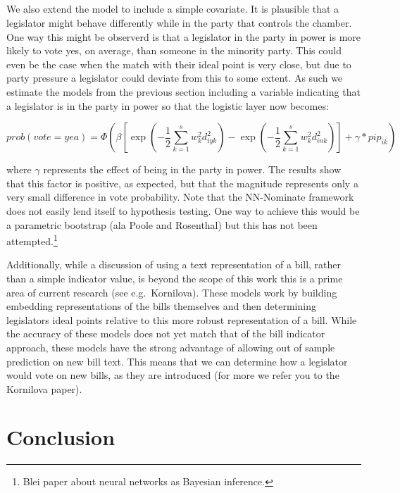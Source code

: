 \documentclass[11pt,]{article}
\begin{document}
\subsection{}\label{section-1}

We also extend the model to include a simple covariate. It is plausible
that a legislator might behave differently while in the party that
controls the chamber. One way this might be observerd is that a
legislator in the party in power is more likely to vote yes, on average,
than someone in the minority party. This could even be the case when the
match with their ideal point is very close, but due to party pressure a
legislator could deviate from this to some extent. As such we estimate
the models from the previous section including a variable indicating
that a legislator is in the party in power so that the logistic layer
now becomes:

\begin{equation}
prob(vote=yea) = \Phi\left(\beta \left[\exp\left(-\frac{1}{2}\sum_{k=1}^s w_k^2 d_{iyk}^2 \right) - \exp\left({-\frac{1}{2}\sum_{k=1}^s w_k^2 d_{ink}^2 }\right)\right] + \gamma * pip_{ik}\right)
\end{equation}

where \(\gamma\) represents the effect of being in the party in power.
The results show that this factor is positive, as expected, but that the
magnitude represents only a very small difference in vote probability.
Note that the NN-Nominate framework does not easily lend itself to
hypothesis testing. One way to achieve this would be a parametric
bootstrap (ala Poole and Rosenthal) but this has not been
attempted.\footnote{Blei paper about neural networks as Bayesian
  inference.}

Additionally, while a discussion of using a text representation of a
bill, rather than a simple indicator value, is beyond the scope of this
work this is a prime area of current research (see e.g.~Kornilova).
These models work by building embedding representations of the bills
themselves and then determining legislators ideal points relative to
this more robust representation of a bill. While the accuracy of these
models does not yet match that of the bill indicator approach, these
models have the strong advantage of allowing out of sample prediction on
new bill text. This means that we can determine how a legislator would
vote on new bills, as they are introduced (for more we refer you to the
Kornilova paper).

\section{Conclusion}\label{conclusion}
\end{document}
